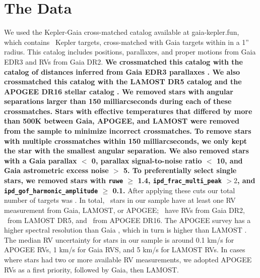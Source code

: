 \section{The Data}
\label{sec:data}

We used the Kepler-Gaia cross-matched catalog available at gaia-kepler.fun,
which contains \nfun\ Kepler targets, cross-matched with Gaia targets within
in a 1'' radius.
This catalog includes positions, parallaxes, and proper motions from
Gaia EDR3 and RVs from Gaia DR2.
{\bf
We crossmatched this catalog with the catalog of distances inferred from Gaia
EDR3 parallaxes \citep{bailer-jones2021}.
We also crossmatched this catalog with the LAMOST DR5 catalog and the APOGEE
DR16 stellar catalog \citep{cui2012, apogee_dr16, xiang2019}.
We removed stars with angular separations larger than 150 milliarcseconds
during each of these crossmatches.
Stars with effective temperatures that differed by more than 500K between
Gaia, APOGEE, and LAMOST were removed from the sample to minimize incorrect
crossmatches.
To remove stars with multiple crossmatches within 150 milliarcseconds, we only
kept the star with the smallest angular separation.
We also removed stars with a Gaia parallax $<$ 0, parallax signal-to-noise
ratio $<$ 10, and Gaia astrometric excess noise $>$ 5.
To preferentially select single stars, we removed stars with {\tt ruwe} $\geq$
1.4, {\tt ipd\_frac\_multi\_peak} $>2$, and {\tt
ipd\_gof\_harmonic\_amplitude} $\geq$ 0.1.
}
After applying these cuts our total number of targets was \nstars.
In total, \nrv\ stars in our sample have at least one RV measurement from
Gaia, LAMOST, or APOGEE; \ngaia\ have RVs from Gaia DR2, \nlamost\ from LAMOST
DR5, and \napogee\ from APOGEE DR16.
The APOGEE survey \citep[R $=$ 22,500;][]{apogee} has a higher spectral
resolution than Gaia \citep[R $=$ 11,500;][]{cropper2018}, which in turn is
higher than LAMOST \citep[R $=$ 1,800;][]{zhao2012}.
The median RV uncertainty for stars in our sample is around 0.1 km/s for
APOGEE RVs, 1 km/s for Gaia RVS, and 5 km/s for LAMOST RVs.
In cases where stars had two or more available RV measurements, we adopted
APOGEE RVs as a first priority, followed by Gaia, then LAMOST.

